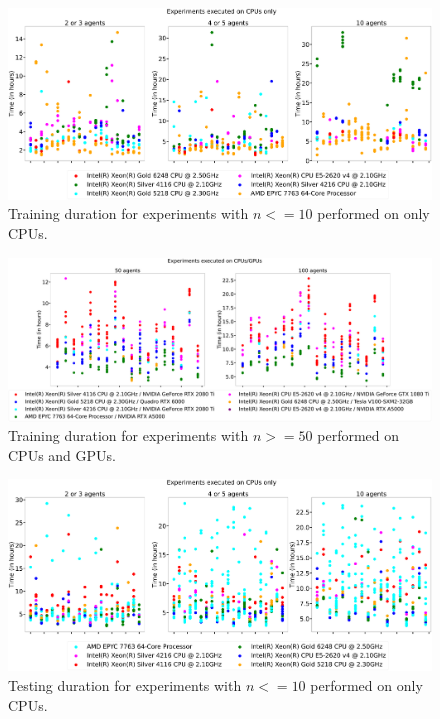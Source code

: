 \begin{figure}
    \centering
    \includegraphics[width=\textwidth]{tex_thesis/figures/ch5/training_time_cpu.pdf}
    \caption{Training duration for experiments with $n<=10$ performed on only CPUs.}
    \label{fig:training_time_cpu}
\end{figure}

\begin{figure}
    \centering
    \includegraphics[width=\textwidth]{tex_thesis/figures/ch5/training_time_gpu.pdf}
    \caption{Training duration for experiments with $n>=50$ performed on CPUs and GPUs.}
    \label{fig:training_time_gpu}
\end{figure}

\begin{figure}
    \centering
    \includegraphics[width=\textwidth]{tex_thesis/figures/ch5/testing_time_cpu.pdf}
    \caption{Testing duration for experiments with $n<=10$ performed on only CPUs.}
    \label{fig:testing_time_cpu}
\end{figure}

